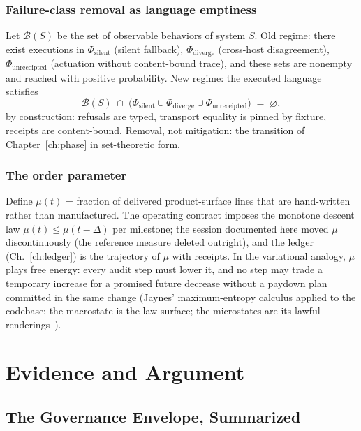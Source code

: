 \documentclass[12pt,oneside]{report}
\theoremstyle{plain}
\theoremstyle{definition}
\theoremstyle{remark}
\begin{document}
\section{Failure-class removal as language emptiness}

Let $\mathcal{B}(S)$ be the set of observable behaviors of system $S$.
Old regime: there exist executions in $\Phi_{\mathrm{silent}}$ (silent
fallback), $\Phi_{\mathrm{diverge}}$ (cross-host disagreement),
$\Phi_{\mathrm{unreceipted}}$ (actuation without content-bound trace),
and these sets are nonempty and reached with positive probability.
New regime: the executed language satisfies
\begin{equation}
\mathcal{B}(S)\;\cap\;\bigl(\Phi_{\mathrm{silent}}\cup
\Phi_{\mathrm{diverge}}\cup\Phi_{\mathrm{unreceipted}}\bigr)
\;=\;\varnothing ,
\end{equation}
by construction: refusals are typed, transport equality is pinned by
fixture, receipts are content-bound. Removal, not mitigation: the
transition of Chapter~\ref{ch:phase} in set-theoretic form.

\section{The order parameter}

Define $\mu(t)$ = fraction of delivered product-surface lines that are
hand-written rather than manufactured. The operating contract imposes
the monotone descent law $\mu(t)\le\mu(t-\Delta)$ per milestone; the
session documented here moved $\mu$ discontinuously (the reference
measure deleted outright), and the ledger
(Ch.~\ref{ch:ledger}) is the trajectory of $\mu$ with receipts. In the
variational analogy, $\mu$ plays free energy: every audit step must
lower it, and no step may trade a temporary increase for a promised
future decrease without a paydown plan committed in the same change
(Jaynes' maximum-entropy calculus applied to the codebase: the
macrostate is the law surface; the microstates are its lawful
renderings~\cite{jaynes1957}).

\part{Evidence and Argument}

\chapter{The Governance Envelope, Summarized}
\label{ch:envelope-summary}
\end{document}

